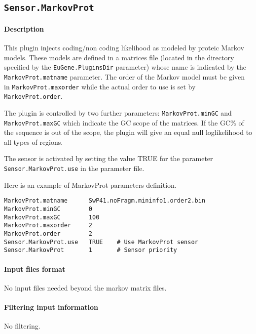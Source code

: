 
\subsection{\texttt{Sensor.MarkovProt}}

\paragraph{Description}

This plugin injects coding/non coding likelihood as modeled by proteic
Markov models. These models are defined in a matrices file (located in
the directory specified by the \texttt{EuGene.PluginsDir} parameter)
whose name is indicated by the \texttt{MarkovProt.matname} parameter.
The order of the Markov model must be given in
\texttt{MarkovProt.maxorder} while the actual order to use is set by
\texttt{MarkovProt.order}.

The plugin is controlled by two further parameters:
\texttt{MarkovProt.minGC} and \texttt{MarkovProt.maxGC} which indicate
the GC scope of the matrices. If the GC\% of the sequence is out of
the scope, the plugin will give an equal null loglikelihood to all types
of regions.

The sensor is activated by setting the value TRUE for the parameter
\texttt{Sensor.MarkovProt.use} in the parameter file.

Here is an example of MarkovProt parameters definition.
\begin{Verbatim}[fontsize=\small]
MarkovProt.matname      SwP41.noFragm.mininfo1.order2.bin
MarkovProt.minGC        0
MarkovProt.maxGC        100
MarkovProt.maxorder     2
MarkovProt.order        2
Sensor.MarkovProt.use   TRUE    # Use MarkovProt sensor
Sensor.MarkovProt       1       # Sensor priority
\end{Verbatim}

\paragraph{Input files format}

No input files  needed beyond the markov matrix files.

\paragraph{Filtering input information}

No filtering.

